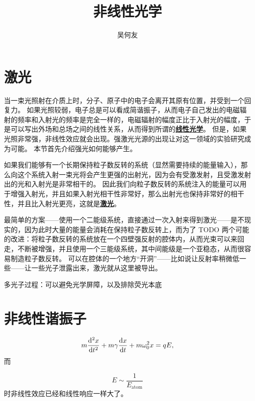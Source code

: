 \documentclass[UTF8, a4paper]{ctexart}
\title{非线性光学}
\author{吴何友}
\newcommand{\concept}[1]{\underline{\textbf{#1}}}
\begin{document}
\maketitle

\section{激光}

当一束光照射在介质上时，分子、原子中的电子会离开其原有位置，并受到一个回复力。
如果光照较弱，电子总是可以看成简谐振子，从而电子自己发出的电磁辐射的频率和入射光的频率是完全一样的，电磁辐射的幅度正比于入射光的幅度，于是可以写出外场和总场之间的线性关系，从而得到所谓的\concept{线性光学}。
但是，如果光照非常强，非线性效应就会出现。强激光光源的出现让对这一领域的实验研究成为可能。
本节首先介绍强光如何能够产生。

如果我们能够有一个长期保持粒子数反转的系统（显然需要持续的能量输入），那么向这个系统入射一束光将会产生更强的出射光，因为会有受激发射，且受激发射出的光和入射光是非常相干的。
因此我们向粒子数反转的系统注入的能量可以用于增强入射光，并且如果入射光相干性非常好，那么出射光也保持非常好的相干性，并且比入射光更亮，这就是\concept{激光}。

最简单的方案——使用一个二能级系统，直接通过一次入射来得到激光——是不现实的，因为此时大量的能量会消耗在保持粒子数反转上，而为了 TODO
两个可能的改进：将粒子数反转的系统放在一个四壁强反射的腔体内，从而光束可以来回走，不断被增强，并且使用一个三能级系统，其中间能级是一个亚稳态，从而很容易制造粒子数反转。
可以在腔体的一个地方“开洞”——比如说让反射率稍微低一些——让一些光子泄露出来，激光就从这里被导出。

多光子过程：可以避免光学屏障，以及排除荧光本底

\section{非线性谐振子}

\begin{equation}
    m \dv[2]{x}{t} + m \gamma \dv{x}{t} + m \omega_0^2 x = q E,
\end{equation}
而

\begin{equation}
    E \sim \frac{1}{E_\text{atom}}
\end{equation}
时非线性效应已经和线性响应一样大了。
\end{document}
